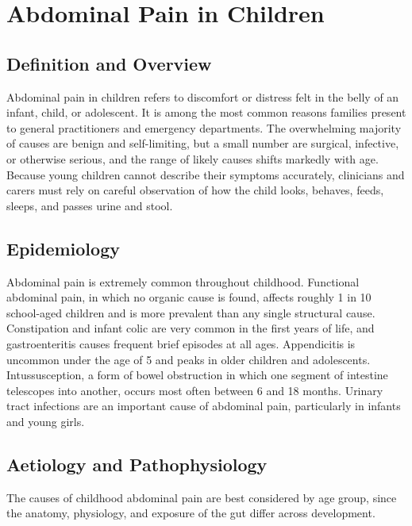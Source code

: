 \chapter{Abdominal Pain in Children}

\section*{Definition and Overview}
Abdominal pain in children refers to discomfort or distress felt in the belly of an infant, child, or adolescent. It is among the most common reasons families present to general practitioners and emergency departments. The overwhelming majority of causes are benign and self-limiting, but a small number are surgical, infective, or otherwise serious, and the range of likely causes shifts markedly with age. Because young children cannot describe their symptoms accurately, clinicians and carers must rely on careful observation of how the child looks, behaves, feeds, sleeps, and passes urine and stool.

\section*{Epidemiology}
Abdominal pain is extremely common throughout childhood. Functional abdominal pain, in which no organic cause is found, affects roughly 1 in 10 school-aged children and is more prevalent than any single structural cause. Constipation and infant colic are very common in the first years of life, and gastroenteritis causes frequent brief episodes at all ages. Appendicitis is uncommon under the age of 5 and peaks in older children and adolescents. Intussusception, a form of bowel obstruction in which one segment of intestine telescopes into another, occurs most often between 6 and 18 months. Urinary tract infections are an important cause of abdominal pain, particularly in infants and young girls.

\section*{Aetiology and Pathophysiology}
The causes of childhood abdominal pain are best considered by age group, since the anatomy, physiology, and exposure of the gut differ across development.

